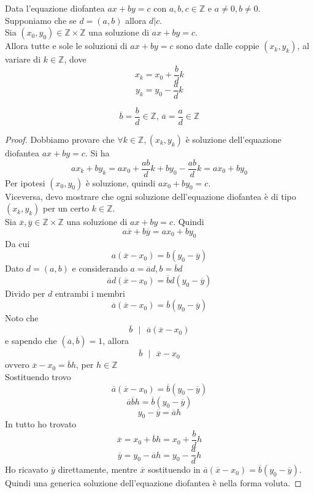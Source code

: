 \documentclass[a4paper,12pt, oneside]{book}
\begin{document}
\begin{teorema}
	Data l'equazione diofantea $ax+by=c$ con $a,b,c \in \mathbb{Z}$ e $a \not = 0, b \not = 0$.\\
	Supponiamo che se $d = (a,b)$ allora $d|c$.\\
	Sia $(x_0,y_0) \in \mathbb{Z} \times \mathbb{Z}$ una soluzione di $ax+by=c$.\\
	Allora tutte e sole le soluzioni di $ax+by=c$ sono date dalle coppie $(x_k,y_k)$, al variare di $k \in \mathbb{Z}$, dove
	$$x_k = x_0 + \frac{b}{d}k$$
	$$y_k = y_0 - \frac{a}{d}k$$
	\begin{nota}
		$$\overline{b} = \frac{b}{d} \in \mathbb{Z} \mbox{, } \overline{a} = \frac{a}{d} \in \mathbb{Z}$$
	\end{nota}
	\begin{proof}
		Dobbiamo provare che $ \forall k \in \mathbb{Z}, (x_k,y_k)$ è soluzione dell'equazione diofantea $ax+by=c$.
		Si ha
		$$ax_k+by_k = ax_0 + \frac{ab}{d}k + by_0 - \frac{ab}{d}k = ax_0+by_0$$
		Per ipotesi $(x_0,y_0)$ è soluzione, quindi $ax_0+by_0=c$.\\

		Viceversa, devo mostrare che ogni soluzione dell'equazione diofantea è di tipo $(x_k,y_k)$ per un certo $k \in \mathbb{Z}$.\\
		Sia $\overline{x}, \overline{y} \in \mathbb{Z} \times \mathbb{Z}$ una soluzione di $ax+by=c$. Quindi
		$$a\overline{x}+b\overline{y} = ax_0+by_0$$
		Da cui
		$$a(\overline{x}-x_0) = b(y_0-\overline{y})$$
		Dato $d=(a,b)$ e considerando $a=\overline{a}d, b=\overline{b}d$
		$$\overline{a}d(\overline{x}-x_0) = \overline{b}d(y_0-\overline{y})$$
		Divido per $d$ entrambi i membri
		$$\overline{a}(\overline{x}-x_0) = \overline{b}(y_0-\overline{y})$$
		Noto che
		$$\overline{b} \mbox{ } | \mbox{ } \overline{a}(\overline{x}-x_0)$$
		e sapendo che $(\overline{a}, \overline{b})=1$, allora
		$$\overline{b} \mbox{ } | \mbox{ } \overline{x}-x_0$$
		ovvero $\overline{x}-x_0 =\overline{b}h$, per $h \in \mathbb{Z}$\\
		Sostituendo trovo
		$$\overline{a}(\overline{x}-x_0) = \overline{b}(y_0-\overline{y})$$
		$$\overline{a}\overline{b}h = \overline{b}(y_0-\overline{y})$$
		$$y_0 - \overline{y} = \overline{a}h$$
		In tutto ho trovato
		$$\overline{x} = x_0+\overline{b}h=x_0+\frac{b}{d}h$$
		$$\overline{y} = y_0-\overline{a}h=y_0-\frac{a}{d}h$$
		Ho ricavato $\overline{y}$ direttamente, mentre $\overline{x}$ sostituendo in $\overline{a}(\overline{x}-x_0) = \overline{b}(y_0-\overline{y})$.\\
		Quindi una generica soluzione dell'equazione diofantea è nella forma voluta.
	\end{proof}
\end{teorema}
\end{document}
